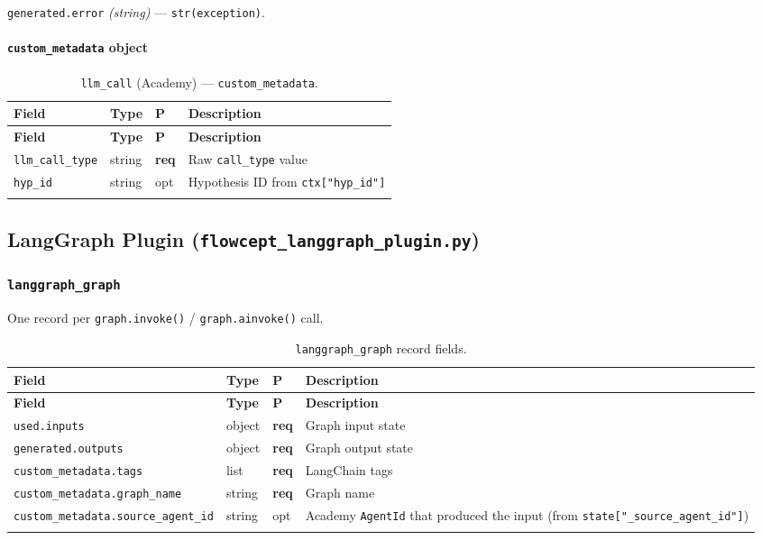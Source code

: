 \documentclass[11pt,a4paper]{article}
\newcommand{\opt}{\textcolor{optred}{opt}}
\newcommand{\req}{\textbf{req}}
\newcommand{\subtype}[1]{\texttt{\textcolor{subtypeblue}{#1}}}
\begin{document}
\vspace{0.3em}
\texttt{generated.error} \textit{(string)} — \texttt{str(exception)}.

\paragraph{\texttt{custom\_metadata} object}

\begin{longtable}{L{4cm} L{2.5cm} C{1.2cm} L{6.5cm}}
\toprule
\textbf{Field} & \textbf{Type} & \textbf{P} & \textbf{Description} \\
\midrule
\endfirsthead
\toprule \textbf{Field} & \textbf{Type} & \textbf{P} & \textbf{Description} \\
\midrule
\endhead
\bottomrule
\endlastfoot

\texttt{llm\_call\_type} & string & \req & Raw \texttt{call\_type} value \\
\texttt{hyp\_id}         & string & \opt & Hypothesis ID from \texttt{ctx["hyp\_id"]} \\

\caption{\subtype{llm\_call} (Academy) — \texttt{custom\_metadata}.}
\end{longtable}

\subsection{LangGraph Plugin (\texttt{flowcept\_langgraph\_plugin.py})}

\subsubsection{\subtype{langgraph\_graph}}

One record per \texttt{graph.invoke()} / \texttt{graph.ainvoke()} call.

\begin{longtable}{L{4cm} L{2.5cm} C{1.2cm} L{6.5cm}}
\toprule
\textbf{Field} & \textbf{Type} & \textbf{P} & \textbf{Description} \\
\midrule
\endfirsthead
\toprule \textbf{Field} & \textbf{Type} & \textbf{P} & \textbf{Description} \\
\midrule
\endhead
\bottomrule
\endlastfoot

\texttt{used.inputs}           & object & \req & Graph input state \\
\texttt{generated.outputs}     & object & \req & Graph output state \\
\texttt{custom\_metadata.tags} & list   & \req & LangChain tags \\
\texttt{custom\_metadata.graph\_name}      & string & \req & Graph name \\
\texttt{custom\_metadata.source\_agent\_id}& string & \opt
  & Academy \texttt{AgentId} that produced the input
    (from \texttt{state["\_source\_agent\_id"]}) \\

\caption{\subtype{langgraph\_graph} record fields.}
\end{longtable}
\end{document}
